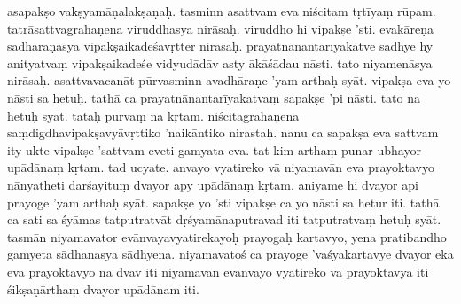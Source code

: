 \documentclass{article}
\begin{document}
\pend
\pstart
 asapakṣo vakṣyamāṇalakṣaṇaḥ. tasminn asattvam eva niścitam tṛtīyaṃ rūpam. tatrāsattvagrahaṇena viruddhasya nirāsaḥ. viruddho hi vipakṣe 'sti. evakāreṇa sādhāraṇasya vipakṣaikadeśavṛtter nirāsaḥ. prayatnānantarīyakatve sādhye hy anityatvaṃ vipakṣaikadeśe vidyudādāv asty ākāśādau nāsti. tato niyamenāsya nirāsaḥ. asattvavacanāt pūrvasminn avadhāraṇe 'yam arthaḥ syāt. vipakṣa eva yo nāsti sa hetuḥ. tathā ca prayatnānantarīyakatvaṃ sapakṣe 'pi nāsti. tato na hetuḥ syāt. tataḥ pūrvaṃ na kṛtam. niścitagrahaṇena saṃdigdhavipakṣavyāvṛttiko 'naikāntiko nirastaḥ. 
\pend
\pstart 
 nanu ca sapakṣa eva sattvam ity ukte vipakṣe 'sattvam eveti gamyata eva. tat kim arthaṃ punar ubhayor upādānaṃ kṛtam. tad ucyate. anvayo vyatireko vā niyamavān eva prayoktavyo nānyatheti darśayituṃ dvayor apy upādānaṃ kṛtam. aniyame hi dvayor api prayoge 'yam arthaḥ syāt. sapakṣe yo 'sti vipakṣe ca yo nāsti sa hetur iti. tathā ca sati sa śyāmas tatputratvāt dṛśyamānaputravad iti tatputratvaṃ hetuḥ syāt. tasmān niyamavator evānvayavyatirekayoḥ prayogaḥ kartavyo, yena pratibandho gamyeta sādhanasya sādhyena. niyamavatoś ca prayoge 'vaśyakartavye dvayor eka eva prayoktavyo na dvāv iti niyamavān evānvayo vyatireko vā prayoktavya iti śikṣaṇārthaṃ dvayor upādānam iti.
\pend
{}\baselineskip
\end{document}
